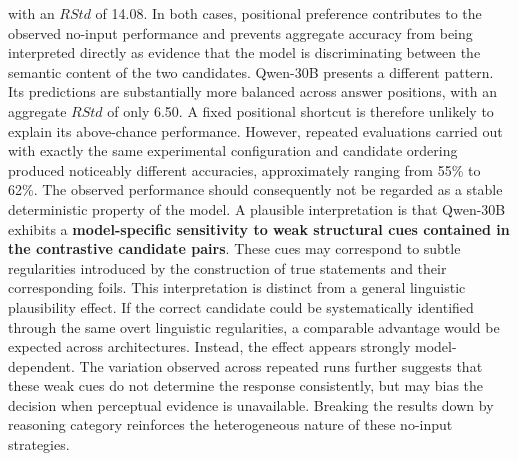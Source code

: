 with an $RStd$ of 14.08. In both cases, positional preference contributes to
the observed no-input performance and prevents aggregate accuracy from being
interpreted directly as evidence that the model is discriminating between the
semantic content of the two candidates.
Qwen-30B presents a different pattern. Its predictions are substantially more
balanced across answer positions, with an aggregate $RStd$ of only 6.50.
A fixed positional shortcut is therefore unlikely to explain its above-chance
performance. However, repeated evaluations carried out with exactly the same
experimental configuration and candidate ordering produced noticeably
different accuracies, approximately ranging from 55\% to 62\%. The observed
performance should consequently not be regarded as a stable deterministic
property of the model.
A plausible interpretation is that Qwen-30B exhibits a
\textbf{model-specific sensitivity to weak structural cues contained in the
contrastive candidate pairs}. These cues may correspond to subtle regularities
introduced by the construction of true statements and their corresponding
foils. This interpretation is distinct from a general linguistic plausibility
effect. If the correct candidate could be systematically identified through
the same overt linguistic regularities, a comparable advantage would be
expected across architectures. Instead, the effect appears strongly
model-dependent. The variation observed across repeated runs further suggests
that these weak cues do not determine the response consistently, but may bias
the decision when perceptual evidence is unavailable.
Breaking the results down by reasoning category reinforces the heterogeneous
nature of these no-input strategies.

